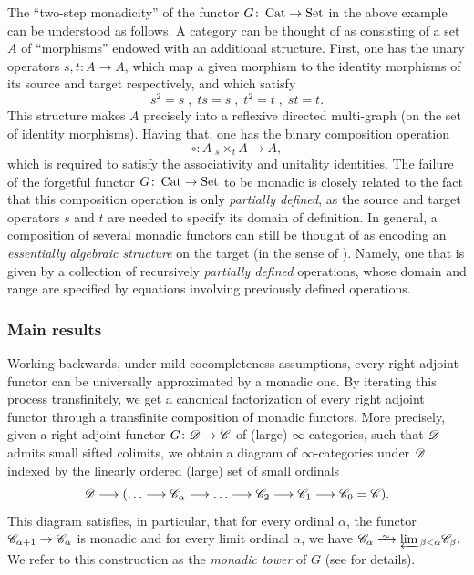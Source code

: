 \documentclass[english]{article}
\begin{document}
The ``two-step monadicity'' of the functor $G\colon \operatorname{Cat} \to \mathrm{Set}$ in the above example can be understood as follows. A category can be thought of as consisting of a set $A$ of ``morphisms'' endowed with an additional structure. First, one has the unary operators $s,t\colon A \to A$, which map a given morphism to the identity morphisms of its source and target respectively, and which satisfy
\[
    s^2=s\;,\;ts=s\;,\;t^2=t\;,\;st=t.
\]
This structure makes $A$ precisely into a reflexive directed multi-graph (on the set of identity morphisms). Having that, one has the binary composition operation
\[
    \circ \colon 
    A\; {}_s\!\!\times_t A \longrightarrow A,
\]
which is required to satisfy the associativity and unitality identities.
The failure of the forgetful functor 
$G\colon \operatorname{Cat} \to \mathrm{Set}$
to be monadic is closely related to the fact that this composition operation is only \textit{partially defined}, as the source and target operators $s$ and $t$ are  needed to specify its domain of definition. In general, a composition of several monadic functors can still be thought of as encoding an \textit{essentially algebraic structure} on the target (in the sense of \cite{freyd1972aspects}). Namely, one that is given by a collection of recursively \textit{partially defined} operations, whose domain and range are specified by equations involving previously defined operations. 


\subsubsection{Main results}

Working backwards, under mild cocompleteness assumptions, every right adjoint functor can be universally approximated by a monadic one. By iterating this process transfinitely, we get a canonical factorization of every right adjoint functor through a transfinite composition of monadic functors. More precisely, 
given a right adjoint functor $G\colon\mathscr{D} \to \mathscr{C}$  of (large) $\infty$-categories, such that $\mathscr{D}$ admits small sifted colimits, we obtain a diagram of $\infty$-categories under $\mathscr{D}$ indexed by the linearly ordered (large) set of small ordinals
\[
    \cD \lto 
    (\dots \lto \cC_\alpha \lto \dots \lto \cC_2 \lto \cC_1 \lto \cC_0 = \cC).
\]
This diagram satisfies, in particular, that for every ordinal $\alpha$, the functor 
$\mathscr{C}_{\alpha+1} \to \mathscr{C}_\alpha$ is monadic and for every limit ordinal $\alpha$, we have 
$\cC_\alpha \iso  \invlim_{\beta<\alpha}\cC_\beta.$
We refer to this construction as the \textit{monadic tower} of $G$ (see  for details). 
\end{document}
